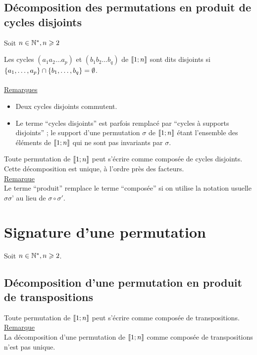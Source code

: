 \subsection{Décomposition des permutations en produit de cycles disjoints}
    Soit \(n \in \mathbb{N}^*, n \geqslant 2\)
\begin{defprop}
    Les cycles \((a_1a_2\dots a_p)\) et \((b_1b_2\dots b_q)\) de \(\left\llbracket1;n\right\rrbracket\) sont dits disjoints si \(\left\lbrace a_1,\dots , a_p\right\rbrace \cap \left\lbrace b_1,\dots , b_q\right\rbrace = \emptyset\).\\~\\
    \underline{Remarques}\\
    \begin{itemize}
        \item Deux cycles disjoints commutent.
        \item Le terme “cycles disjoints” est parfois remplacé par “cycles à supports disjoints” ; le support d’une permutation \(\sigma\) de \(\left\llbracket1;n\right\rrbracket\) étant l’ensemble des éléments de \(\left\llbracket1;n\right\rrbracket\) qui ne sont pas invariants par \(\sigma\).
    \end{itemize}
\end{defprop}
\begin{defprop}
    Toute permutation de \(\left\llbracket1;n\right\rrbracket\) peut s’écrire comme composée de cycles disjoints. Cette décomposition est unique, à l’ordre près des facteurs.\\
    \underline{Remarque}\\
    Le terme “produit” remplace le terme “composée” si on utilise la notation usuelle \(\sigma\sigma’\) au lieu de \(\sigma \circ \sigma'\).
\end{defprop}
\section{Signature d’une permutation}
    Soit \(n \in \mathbb{N}^*, n \geqslant 2\).
\subsection{Décomposition d’une permutation en produit de transpositions}
\begin{defprop}
    Toute permutation de \(\left\llbracket1;n\right\rrbracket\) peut s’écrire comme composée de transpositions.\\
    \underline{Remarque}\\
    La décomposition d’une permutation de \(\left\llbracket1;n\right\rrbracket\) comme composée de transpositions n’est pas unique.
\end{defprop}
